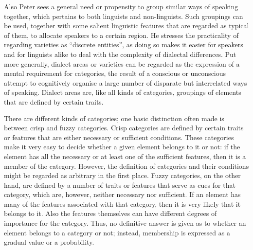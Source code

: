 \documentclass[output=paper]{LSP/langsci}
\begin{document}
Also Peter \citet[807]{wiesinger_einteilung_1983} sees a general need or propensity to group similar ways of speaking together, which pertains to both linguists and non-linguists. Such groupings can be used, together with some salient linguistic features that are regarded as typical of them, to allocate speakers to a certain region. He stresses the practicality of regarding varieties as “discrete entities”, as doing so makes it easier for speakers and for linguists alike to deal with the complexity of dialectal differences. Put more generally, dialect areas or varieties can be regarded as the expression of a mental requirement for categories, the result of a conscious or unconscious attempt to cognitively organise a large number of disparate but interrelated ways of speaking. Dialect areas are, like all kinds of categories, groupings of elements that are defined by certain traits.

There are different kinds of categories; one basic distinction often made is between crisp and fuzzy categories. Crisp categories are defined by certain traits or features that are either necessary or sufficient conditions. These categories make it very easy to decide whether a given element belongs to it or not: if the element has all the necessary or at least one of the sufficient features, then it is a member of the category. However, the definition of categories and their conditions might be regarded as arbitrary in the first place. Fuzzy categories, on the other hand, are defined by a number of traits or features that serve as cues for that category, which are, however, neither necessary nor sufficient. If an element has many of the features associated with that category, then it is very likely that it belongs to it. Also the features themselves can have different degrees of importance for the category. Thus, no definitive answer is given as to whether an element belongs to a category or not; instead, membership is expressed as a gradual value or a probability. 
\end{document}
